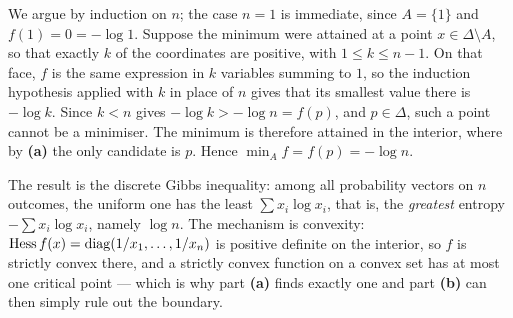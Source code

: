 \begin{exercisesolution}
\begin{enumerate}[label=\textbf{(\alph*)}]
    We argue by induction on $n$; the case $n=1$ is immediate, since $A=\{1\}$ and $f(1)=0=-\log1$.
    Suppose the minimum were attained at a point $x \in \Delta \setminus A$, so that exactly
    $k$ of the coordinates are positive, with $1 \le k \le n-1$. On that face, $f$ is the same
    expression in $k$ variables summing to $1$, so the induction hypothesis applied with $k$ in
    place of $n$ gives that its smallest value there is $-\log k$. Since $k < n$ gives $-\log k > -\log n = f(p)$, and
    $p \in \Delta$, such a point cannot be a minimiser. The minimum is therefore attained in the
    interior, where by \textbf{(a)} the only candidate is $p$. Hence $\min_A f = f(p) = -\log n$.
\end{enumerate}
\begin{remark}
The result is the discrete Gibbs inequality: among all probability vectors on $n$ outcomes, the
uniform one has the least $\sum x_i\log x_i$, that is, the \emph{greatest} entropy $-\sum x_i \log
x_i$, namely $\log n$. The mechanism is convexity: $\operatorname{Hess} f(x) = \operatorname{diag}(1/x_1,\dots,1/x_n)$ is
positive definite on the interior, so $f$ is strictly convex there, and a strictly convex function on
a convex set has at most one critical point --- which is why part \textbf{(a)} finds exactly one and
part \textbf{(b)} can then simply rule out the boundary.
\end{remark}
\end{exercisesolution}

